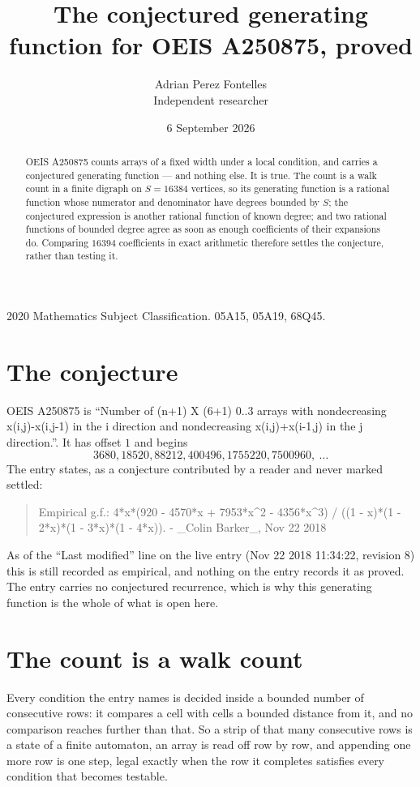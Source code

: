 \documentclass[11pt,a4paper]{article}
\title{The conjectured generating function for OEIS A250875, proved}
\author{Adrian Perez Fontelles\\ \small Independent researcher}
\date{6 September 2026}
\theoremstyle{plain}
\theoremstyle{definition}
\begin{document}
\maketitle

\begin{abstract}
OEIS A250875 counts arrays of a fixed width under a local condition, and carries a conjectured
generating function --- and nothing else. It is true. The count is a walk count in a finite
digraph on $S=16384$ vertices, so its generating function is a rational function whose numerator
and denominator have degrees bounded by $S$; the conjectured expression is another rational
function of known degree; and two rational functions of bounded degree agree as soon as enough
coefficients of their expansions do. Comparing $16394$ coefficients in exact arithmetic
therefore settles the conjecture, rather than testing it.
\end{abstract}

\noindent\small 2020 Mathematics Subject Classification. 05A15, 05A19, 68Q45.\normalsize

\section{The conjecture}

OEIS A250875 is ``Number of (n+1) X (6+1) 0..3 arrays with nondecreasing x(i,j)-x(i,j-1) in the i direction and nondecreasing x(i,j)+x(i-1,j) in the j direction.''. It has offset $1$ and begins
\[
3680, 18520, 88212, 400496, 1755220, 7500960,\ \dots
\]
The entry states, as a conjecture contributed by a reader and never marked settled:
\begin{quote}
Empirical g.f.: 4*x*(920 - 4570*x + 7953*x\^{}2 - 4356*x\^{}3) / ((1 - x)*(1 - 2*x)*(1 - 3*x)*(1 - 4*x)). - \_Colin Barker\_, Nov 22 2018
\end{quote}
As of the ``Last modified'' line on the live entry (Nov 22 2018 11:34:22, revision 8) this is still
recorded as empirical, and nothing on the entry records it as proved. The entry carries no
conjectured recurrence, which is why this generating function is the whole of what is open
here.

\section{The count is a walk count}

Every condition the entry names is decided inside a bounded number of consecutive rows: it
compares a cell with cells a bounded distance from it, and no comparison reaches further than
that. So a strip of that many consecutive rows is a state of a finite automaton, an array is
read off row by row, and appending one more row is one step, legal exactly when the row it
completes satisfies every condition that becomes testable.
\end{document}
